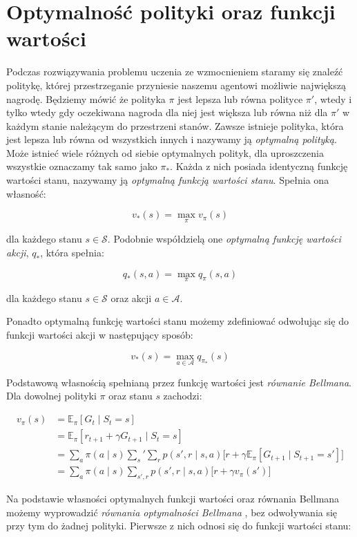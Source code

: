 \documentclass[licencjacka]{pracamgr}
\begin{document}
\section{Optymalność polityki oraz funkcji wartości}

Podczas rozwiązywania problemu uczenia ze wzmocnieniem staramy się znaleźć politykę, której przestrzeganie przyniesie naszemu agentowi możliwie największą nagrodę. Będziemy mówić że polityka $\pi$ jest lepsza lub równa polityce $\pi'$, wtedy i tylko wtedy gdy oczekiwana nagroda dla niej jest większa lub równa niż dla $\pi'$ w każdym stanie należącym do przestrzeni stanów. Zawsze istnieje polityka, która jest lepsza lub równa od wszystkich innych i nazywamy ją \emph{optymalną polityką}. Może istnieć wiele różnych od siebie optymalnych polityk, dla uproszczenia wszystkie oznaczamy tak samo jako $\pi_{\ast}$. Każda z nich posiada identyczną funkcję wartości stanu, nazywamy ją \emph{optymalną funkcją wartości stanu}. Spełnia ona własność:

$$ v_{\ast}(s) = \max_{\pi} v_{\pi}(s) $$

dla każdego stanu $s \in \mathcal{S}$. Podobnie współdzielą one \emph{optymalną funkcję wartości akcji}, $q_{\ast}$, która spełnia:

$$ q_{\ast}(s, a) = \max_{\pi} q_{\pi}(s, a) $$

dla każdego stanu $s \in \mathcal{S}$ oraz akcji $a \in \mathcal{A}$.

Ponadto optymalną funkcję wartości stanu możemy zdefiniować odwołując się do funkcji wartości akcji w następujący sposób:

$$ v_{\ast}(s) = \max_{a \in \mathcal{A}} q_{\pi_{\ast}}(s) $$

Podstawową własnością spełnianą przez funkcję wartości jest \emph{równanie Bellmana}. Dla dowolnej polityki $\pi$ oraz stanu $s$ zachodzi:

\begin{align}
v_{\pi}(s) &= \mathbb{E}_{\pi}[G_t \mid S_t = s]  \nonumber \\
&= \mathbb{E}_{\pi}[r_{t+1} + \gamma G_{t+1} \mid S_t = s] \nonumber \\
&= \sum_a \pi(a \mid s) \sum_s' \sum_r p(s', r \mid s, a) \Big[r + \gamma \mathbb{E}_{\pi}[G_{t+1} \mid S_{t+1} = s' ]\Big] \nonumber \\
&= \sum_a \pi(a \mid s) \sum_{s', r} p(s', r \mid s, a) \Big[r + \gamma v_{\pi}(s') \Big]
\end{align}

Na podstawie własności optymalnych funkcji wartości oraz równania Bellmana możemy wyprowadzić \emph{równania optymalności Bellmana} \cite{bellman1954, bellman1957}, bez odwoływania się przy tym do żadnej polityki. Pierwsze z nich odnosi się do funkcji wartości stanu:
\end{document}
